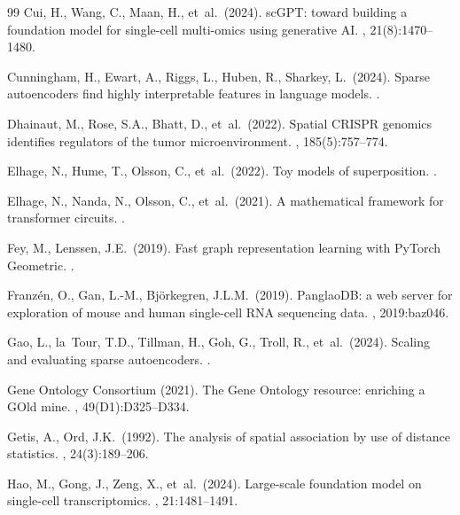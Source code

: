 \documentclass[11pt]{article}
\begin{document}
\begin{thebibliography}{99}
Cui, H., Wang, C., Maan, H., et~al.\ (2024).
\newblock scGPT: toward building a foundation model for single-cell
  multi-omics using generative AI.
, 21(8):1470--1480.

Cunningham, H., Ewart, A., Riggs, L., Huben, R., Sharkey, L.\ (2024).
\newblock Sparse autoencoders find highly interpretable features in
  language models.
.

Dhainaut, M., Rose, S.A., Bhatt, D., et~al.\ (2022).
\newblock Spatial CRISPR genomics identifies regulators of the tumor
  microenvironment.
, 185(5):757--774.

Elhage, N., Hume, T., Olsson, C., et~al.\ (2022).
\newblock Toy models of superposition.
.

Elhage, N., Nanda, N., Olsson, C., et~al.\ (2021).
\newblock A mathematical framework for transformer circuits.
.

Fey, M., Lenssen, J.E.\ (2019).
\newblock Fast graph representation learning with PyTorch Geometric.
.

Franz\'en, O., Gan, L.-M., Bj\"orkegren, J.L.M.\ (2019).
\newblock PanglaoDB: a web server for exploration of mouse and human
  single-cell RNA sequencing data.
, 2019:baz046.

Gao, L., la~Tour, T.D., Tillman, H., Goh, G., Troll, R., et~al.\ (2024).
\newblock Scaling and evaluating sparse autoencoders.
.

{Gene Ontology Consortium} (2021).
\newblock The Gene Ontology resource: enriching a GOld mine.
, 49(D1):D325--D334.

Getis, A., Ord, J.K.\ (1992).
\newblock The analysis of spatial association by use of distance statistics.
, 24(3):189--206.

Hao, M., Gong, J., Zeng, X., et~al.\ (2024).
\newblock Large-scale foundation model on single-cell transcriptomics.
, 21:1481--1491.


\end{thebibliography}
\end{document}

